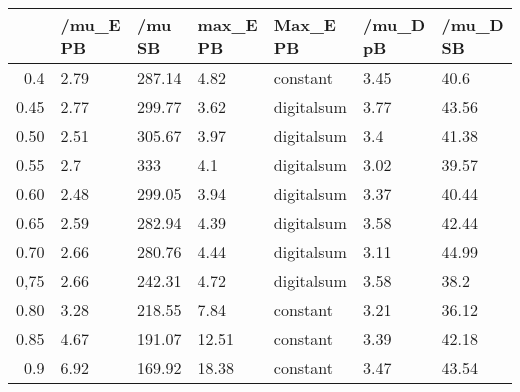 \begin{table}[ht]
\centering
\begin{tabular}{rllllll}
  \hline
 & /mu\_E PB & /mu SB & max\_E PB & Max\_E PB & /mu\_D pB & /mu\_D SB \\ 
  \hline
0.4 & 2.79 & 287.14 & 4.82 & constant & 3.45 & 40.6 \\ 
  0.45 & 2.77 & 299.77 & 3.62 & digitalsum & 3.77 & 43.56 \\ 
  0.50 & 2.51 & 305.67 & 3.97 & digitalsum & 3.4 & 41.38 \\ 
  0.55 & 2.7 & 333 & 4.1 & digitalsum & 3.02 & 39.57 \\ 
  0.60 & 2.48 & 299.05 & 3.94 & digitalsum & 3.37 & 40.44 \\ 
  0.65 & 2.59 & 282.94 & 4.39 & digitalsum & 3.58 & 42.44 \\ 
  0.70 & 2.66 & 280.76 & 4.44 & digitalsum & 3.11 & 44.99 \\ 
  0,75 & 2.66 & 242.31 & 4.72 & digitalsum & 3.58 & 38.2 \\ 
  0.80 & 3.28 & 218.55 & 7.84 & constant & 3.21 & 36.12 \\ 
  0.85 & 4.67 & 191.07 & 12.51 & constant & 3.39 & 42.18 \\ 
  0.9 & 6.92 & 169.92 & 18.38 & constant & 3.47 & 43.54 \\ 
   \hline
\end{tabular}
\end{table}
